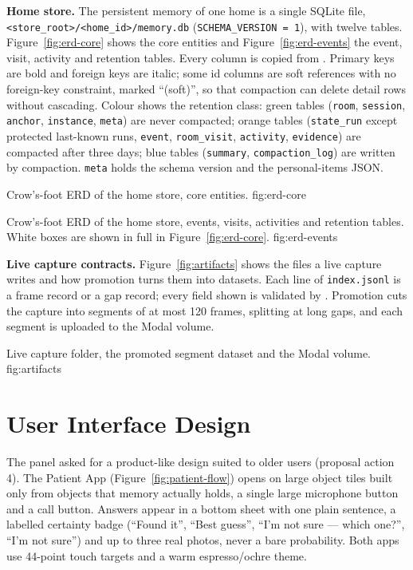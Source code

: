 \textbf{Home store.} The persistent memory of one home is a single SQLite file,
\texttt{<store\_root>/<home\_id>/memory.db} (\texttt{SCHEMA\_VERSION = 1}),
with twelve tables. Figure~\ref{fig:erd-core} shows the core entities and
Figure~\ref{fig:erd-events} the event, visit, activity and retention tables.
Every column is copied from . Primary keys are bold and
foreign keys are italic; some id columns are soft references with no
foreign-key constraint, marked ``(soft)'', so that compaction can delete
detail rows without cascading. Colour shows the retention class: green tables
(\texttt{room}, \texttt{session}, \texttt{anchor}, \texttt{instance},
\texttt{meta}) are never compacted; orange tables (\texttt{state\_run} except
protected last-known runs, \texttt{event}, \texttt{room\_visit},
\texttt{activity}, \texttt{evidence}) are compacted after three days; blue
tables (\texttt{summary}, \texttt{compaction\_log}) are written by compaction.
\texttt{meta} holds the schema version and the personal-items JSON.

  {Crow's-foot ERD of the home store, core entities.}
  {fig:erd-core}

  {Crow's-foot ERD of the home store, events, visits, activities and
   retention tables. White boxes are shown in full in Figure~\ref{fig:erd-core}.}
  {fig:erd-events}

\textbf{Live capture contracts.} Figure~\ref{fig:artifacts} shows the files a
live capture writes and how promotion turns them into datasets. Each line of
\texttt{index.jsonl} is a frame record or a gap record; every field shown is
validated by . Promotion cuts the capture into
segments of at most 120 frames, splitting at long gaps, and each segment is
uploaded to the Modal volume.

  {Live capture folder, the promoted segment dataset and the Modal volume.}
  {fig:artifacts}

\section{User Interface Design}
\label{sec:ui}
The panel asked for a product-like design suited to older users (proposal
action 4). The Patient App (Figure~\ref{fig:patient-flow}) opens on large
object tiles built only from objects that memory actually holds, a single large
microphone button and a call button. Answers appear in a bottom sheet with one
plain sentence, a labelled certainty badge (``Found it'', ``Best guess'', ``I'm
not sure --- which one?'', ``I'm not sure'') and up to three real photos, never
a bare probability. Both apps use 44-point touch targets and a warm
espresso/ochre theme.

